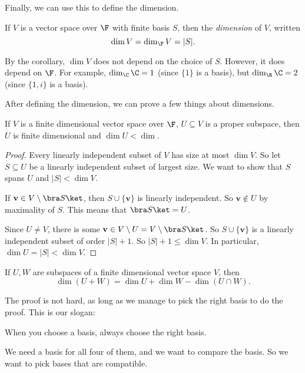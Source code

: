 \documentclass[a4paper]{article}
\begin{document}
Finally, we can use this to define the dimension.
\begin{defi}[Dimension]
  If $V$ is a vector space over $\F$ with finite basis $S$, then the \emph{dimension} of $V$, written
  \[
    \dim V = \dim_{\F}V = |S|.
  \]
\end{defi}
By the corollary, $\dim V$ does not depend on the choice of $S$. However, it does depend on $\F$. For example, $\dim_\C \C = 1$ (since $\{1\}$ is a basis), but $\dim_\R \C = 2$ (since $\{1, i\}$ is a basis).

After defining the dimension, we can prove a few things about dimensions.
\begin{lemma}
  If $V$ is a finite dimensional vector space over $\F$, $U\subseteq V$ is a proper subspace, then $U$ is finite dimensional and $\dim U < \dim $.
\end{lemma}

\begin{proof}
  Every linearly independent subset of $V$ has size at most $\dim V$. So let $S \subseteq U$ be a linearly independent subset of largest size. We want to show that $S$ spans $U$ and $|S| < \dim V$.

  If $\mathbf{v}\in V\setminus \bra S\ket$, then $S\cup \{\mathbf{v}\}$ is linearly independent. So $\mathbf{v}\not\in U$ by maximality of $S$. This means that $\bra S\ket = U$.

  Since $U\not= V$, there is some $\mathbf{v}\in V\setminus U = V\setminus \bra S\ket$. So $S\cup \{\mathbf{v}\}$ is a linearly independent subset of order $|S| + 1$. So $|S| + 1 \leq \dim V$. In particular, $\dim U = |S| < \dim V$.
\end{proof}

\begin{prop}
  If $U, W$ are subspaces of a finite dimensional vector space $V$, then
  \[
    \dim (U + W) = \dim U + \dim W - \dim (U\cap W).
  \]
\end{prop}
The proof is not hard, as long as we manage to pick the right basis to do the proof. This is our slogan:
\begin{center}
  When you choose a basis, always choose the right basis.
\end{center}
We need a basis for all four of them, and we want to compare the basis. So we want to pick bases that are compatible.
\end{document}
